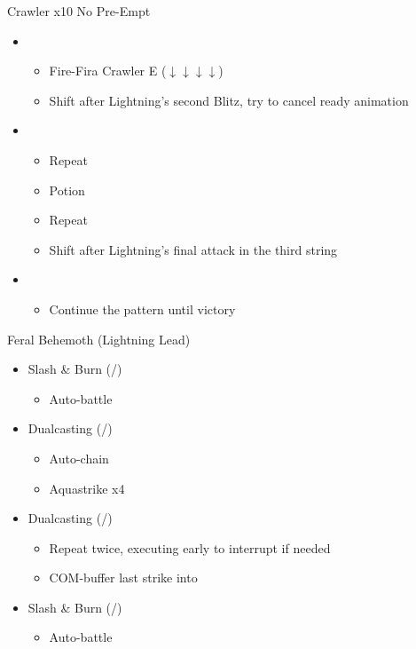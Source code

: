 \begin{battle}{Crawler x10 No Pre-Empt}
\begin{itemize}
    \item \first
    \begin{itemize}
        \item Fire-Fira Crawler E ($\downarrow \downarrow \downarrow \downarrow$)
        \item Shift after Lightning's second Blitz, try to cancel ready animation
    \end{itemize}
    \item \sixth
    \begin{itemize}
        \item Repeat
        \item Potion
        \item Repeat
        \item Shift after Lightning's final attack in the third string
    \end{itemize}
    \item \first
    \begin{itemize}
        \item Continue the pattern until victory
    \end{itemize}
\end{itemize}
\end{battle}
\renewcommand{\first}{[1] Slash \& Burn (\com/\rav)}
\renewcommand{\second}{[2] War \& Peace (\com/\med)}
\renewcommand{\third}{[3] Supersoldier (\com/\syn)}
\renewcommand{\fourth}{[4] Dualcasting (\rav/\rav)}
\renewcommand{\fifth}{[5] Dualcasting (\rav/\rav)}
\renewcommand{\sixth}{[6] Slash \& Burn (\com/\rav)}
\begin{battle}{Feral Behemoth (Lightning Lead)}
\begin{itemize}
    \item \first
    \begin{itemize}
        \item Auto-battle
    \end{itemize}
    \item \fourth
    \begin{itemize}
        \item Auto-chain
        \item Aquastrike x4
    \end{itemize}
    \item \fifth
    \begin{itemize}
        \item Repeat twice, executing early to interrupt if needed
        \item COM-buffer last strike into
    \end{itemize}
    \item \first
    \begin{itemize}
        \item Auto-battle
    \end{itemize}
\end{itemize}
\end{battle}

